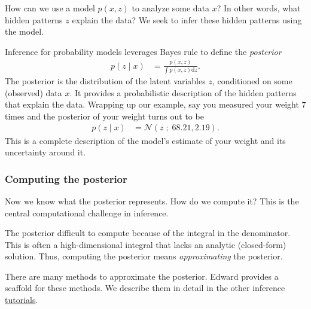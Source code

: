 How can we use a model $p(x,z)$ to analyze some data $x$? In other words,
what hidden patterns $z$ explain the data? We seek to infer these
hidden patterns using the model.

Inference for probability models leverages Bayes rule to define the 
\emph{posterior}
\begin{align*}
  p(z \mid x)
  &=
  \frac{p(x,z)}{\int p(x,z) \text{d}z}.
\end{align*}
The posterior is the distribution of the latent variables $z$, conditioned on
some (observed) data $x$. It provides a probabilistic description of the hidden
patterns that explain the data. Wrapping up our example, say you measured your
weight $7$ times and the posterior of your weight turns out to be
\begin{align*}
  p(z \mid x) &= \mathcal{N}(z\;;\; 68.21, 2.19).
\end{align*}
This is a complete description of the model's estimate of your weight and its
uncertainty around it.


\subsubsection{Computing the posterior}

Now we know what the posterior represents. How do we compute it? This is the
central computational challenge in inference.

The posterior difficult to compute because of the integral in the denominator.
This is often a high-dimensional integral that lacks an analytic (closed-form)
solution. Thus, computing the posterior means \emph{approximating} the
posterior.

There are many methods to approximate the posterior. Edward provides a scaffold
for these methods. We describe them in detail in the other inference 
\href{tutorials.html}{tutorials}.
